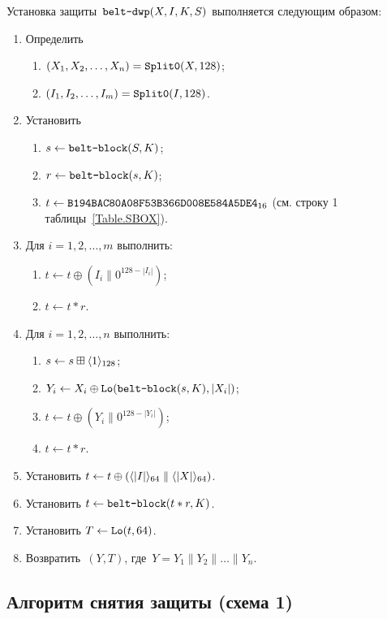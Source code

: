 Установка защиты~$\texttt{belt-dwp}(X,I,K,S)$ выполняется следующим образом:
\begin{enumerate}
\item
Определить 
\begin{enumerate}
\item
$(X_1,X_2,\ldots,X_n)=\mathop{\texttt{Split0}}\nolimits(X, 128)$;
\item
$(I_1,I_2,\ldots,I_m)=\mathop{\texttt{Split0}}\nolimits(I, 128)$. 
\end{enumerate}
\item
Установить
\begin{enumerate}
\item
$s\leftarrow\texttt{belt-block}(S,K)$;
\item
$r\leftarrow \texttt{belt-block}(s,K)$;
\item
$t\leftarrow\texttt{B194BAC80A08F53B366D008E584A5DE4}_{16}$
(см. строку 1 таблицы~\ref{Table.SBOX}).
\end{enumerate}

\item
Для $i=1,2,\ldots,m$ выполнить:
\begin{enumerate}
\item
$t\leftarrow t\oplus (I_i\parallel 0^{128-|I_i|})$;
\item
$t\leftarrow t\ast r$.
\end{enumerate}

\item
Для $i=1,2,\ldots,n$ выполнить:
\begin{enumerate}
\item
$s\leftarrow s\boxplus\langle1\rangle_{128}$;
\item
$Y_i\leftarrow X_i\oplus\mathop{\texttt{Lo}}\nolimits(\texttt{belt-block}(s,K), |X_i|)$;
\item
$t\leftarrow t\oplus (Y_i\parallel 0^{128-|Y_i|})$;
\item
$t\leftarrow t\ast r$.
\end{enumerate}

\item
Установить
$t\leftarrow t\oplus 
(\langle|I|\rangle_{64}\parallel\langle|X|\rangle_{64})$.
\item
Установить
$t\leftarrow \texttt{belt-block}(t\ast r,K)$.
\item
Установить
$T\leftarrow \mathop{\texttt{Lo}}\nolimits(t, 64)$.
\item
Возвратить~$(Y,T)$, 
где~$Y=Y_1\parallel Y_2\parallel\ldots\parallel Y_n$.
\end{enumerate}

\subsection{Алгоритм снятия защиты (схема 1)}\label{AE.DWP.Unwrap}

